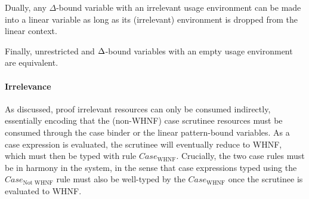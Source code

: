 \documentclass[acmsmall,review,anonymous,screen]{acmart}
\begin{document}
\LinearDeltaRelationLemma


\noindent Dually, any $\Delta$-bound variable with an irrelevant usage
environment can be made into a linear variable as long as its
(irrelevant) environment is dropped from the linear context.


\DeltaLinearRelationLemma


\noindent Finally, unrestricted and $\Delta$-bound
variables with an empty usage environment are equivalent.

\DeltaUnrestrictedRelationLemma

\paragraph{Irrelevance}
%
As discussed, proof irrelevant resources can only be consumed
indirectly, essentially encoding that the (non-WHNF) case scrutinee
resources must be consumed through the case binder or the linear
pattern-bound variables.
%
As a case expression is evaluated, the scrutinee will eventually
reduce to WHNF,
which must then be typed with rule $Case_{\textrm{WHNF}}$.
%
Crucially, the two case rules must be in harmony in the system, in the sense that
case expressions typed using the $Case_{\textrm{Not WHNF}}$ rule must also be
well-typed by the $Case_{\textrm{WHNF}}$ once the scrutinee is evaluated to WHNF.


\end{document}
